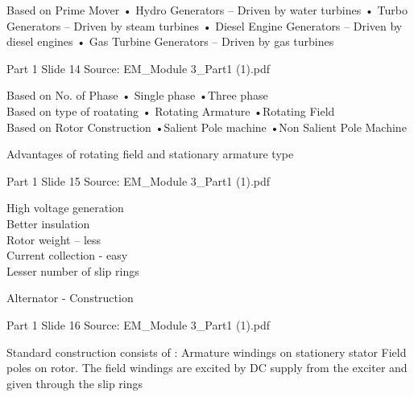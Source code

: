 \documentclass[11pt,a4paper]{article}
\begin{document}
\begin{mdframed}[roundcorner=9pt,backgroundcolor=white,linecolor=anthBlue,linewidth=1pt,innerleftmargin=12pt,innerrightmargin=12pt,innertopmargin=10pt,innerbottommargin=10pt,skipabove=8pt,skipbelow=10pt]
{\HeadingFont\fontsize{15}{18}\selectfont\color{anthDark}Based on Prime Mover • Hydro Generators – Driven by water turbines • Turbo Generators – Driven by steam turbines • Diesel Engine Generators – Driven by diesel engines • Gas Turbine Generators – Driven by gas turbines\par}
{\color{anthMid}\small Part 1 \textbullet{} Slide 14 \textbullet{} Source: EM\_Module 3\_Part1 (1).pdf\par}
\vspace{0.5em}
{\small
Based on No. of Phase • Single phase •Three phase\\
Based on type of roatating • Rotating Armature •Rotating Field\\
Based on Rotor Construction •Salient Pole machine •Non Salient Pole Machine\\

}
\end{mdframed}

\begin{mdframed}[roundcorner=9pt,backgroundcolor=white,linecolor=anthGreen,linewidth=1pt,innerleftmargin=12pt,innerrightmargin=12pt,innertopmargin=10pt,innerbottommargin=10pt,skipabove=8pt,skipbelow=10pt]
{\HeadingFont\fontsize{15}{18}\selectfont\color{anthDark}Advantages of rotating field and stationary armature type\par}
{\color{anthMid}\small Part 1 \textbullet{} Slide 15 \textbullet{} Source: EM\_Module 3\_Part1 (1).pdf\par}
\vspace{0.5em}
{\small
\smallskip
High voltage generation\\
Better insulation\\
Rotor weight – less\\
Current collection - easy\\
Lesser number of slip rings\\

}
\end{mdframed}

\begin{mdframed}[roundcorner=9pt,backgroundcolor=white,linecolor=anthOrange,linewidth=1pt,innerleftmargin=12pt,innerrightmargin=12pt,innertopmargin=10pt,innerbottommargin=10pt,skipabove=8pt,skipbelow=10pt]
{\HeadingFont\fontsize{15}{18}\selectfont\color{anthDark}Alternator - Construction\par}
{\color{anthMid}\small Part 1 \textbullet{} Slide 16 \textbullet{} Source: EM\_Module 3\_Part1 (1).pdf\par}
\vspace{0.5em}
{\small
Standard construction consists of : Armature windings on stationery stator Field poles on rotor. The field windings are excited by DC supply from the exciter and given through the slip rings\\

}
\end{mdframed}
\end{document}
